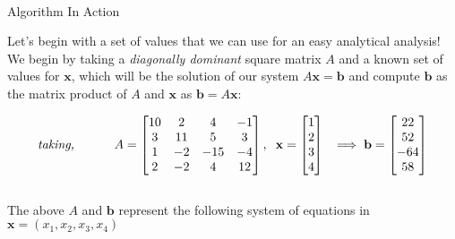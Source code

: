 \documentclass[main]{subfiles}
\begin{document}
    
    \\
    {\large Algorithm In Action}\\
    \vspace{15mm}

    \noindent Let's begin with a set of values that we can use for an easy analytical analysis!
        We begin by taking a \textit{diagonally dominant} square matrix $A$ and a known set of values for 
        $\textbf{x}$, which will be the solution of our system $A\textbf{x} = \textbf{b}$ and compute
        $\textbf{b}$ as the matrix product of $A$ and $\textbf{x}$ as $\textbf{b} = A\textbf{x}$:

        \begin{equation}   
            \textit{taking, } \hspace{10mm} A = \begin{bmatrix}
                10 & 2 & 4 & -1 \\
                3 & 11 & 5 & 3 \\
                1 & -2 & -15 &-4 \\
                2 & -2 & 4 & 12 
            \end{bmatrix},\hspace{2mm}
            \textbf{x} = \begin{bmatrix}
                1 \\
                2 \\
                3 \\
                4 \\
            \end{bmatrix}
            \hspace{2mm}
        \implies \textbf{b} = \begin{bmatrix}
                22 \\
                52 \\
                -64\\
                58 \\
            \end{bmatrix}
        \end{equation}
\vspace{10mm}
\\
The above $A$ and $\textbf{b}$ represent the following system of equations in $\textbf{x} = (x_1, x_2, x_3, x_4)$  
\end{document}
